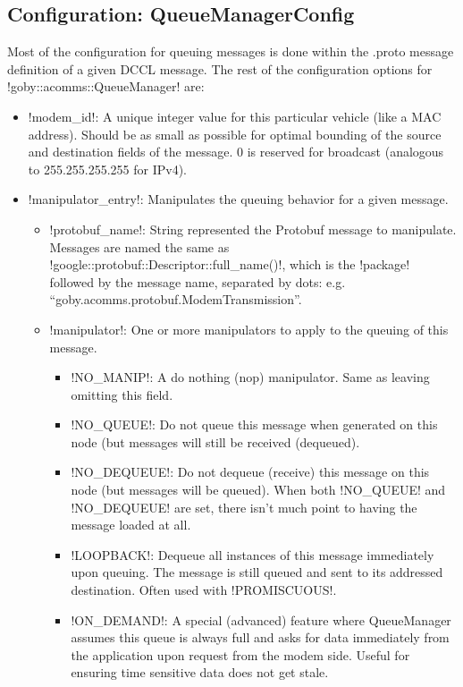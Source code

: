 \subsection{Configuration: QueueManagerConfig}

Most of the configuration for queuing messages is done within the .proto message definition of a given DCCL message. The rest of the configuration options for !goby::acomms::QueueManager! are:

\resetbvlinenumber

\begin{itemize}
\item !modem_id!: A unique integer value for this particular vehicle (like a MAC address). Should be as small as possible for optimal bounding of the source and destination fields of the message. 0 is reserved for broadcast (analogous to 255.255.255.255 for IPv4).
\item !manipulator_entry!: Manipulates the queuing behavior for a given message.
\begin{itemize}
\item !protobuf_name!: String represented the Protobuf message to manipulate. Messages are named the same as !google::protobuf::Descriptor::full_name()!, which is the !package! followed by the message name, separated by dots: e.g. ``goby.acomms.protobuf.ModemTransmission''.
\item !manipulator!: One or more manipulators to apply to the queuing of this message.
\begin{itemize}
\item !NO_MANIP!: A do nothing (nop) manipulator. Same as leaving omitting this field.
\item !NO_QUEUE!: Do not queue this message when generated on this node (but messages will still be received (dequeued).
\item !NO_DEQUEUE!: Do not dequeue (receive) this message on this node (but messages will be queued). When both !NO_QUEUE! and !NO_DEQUEUE! are set, there isn't much point to having the message loaded at all.
\item !LOOPBACK!: Dequeue all instances of this message immediately upon queuing. The message is still queued and sent to its addressed destination. Often used with !PROMISCUOUS!.
\item !ON_DEMAND!: A special (advanced) feature where QueueManager assumes this queue is always full and asks for data immediately from the application upon request from the modem side. Useful for ensuring time sensitive data does not get stale.

\end{itemize}
\end{itemize}
\end{itemize}
